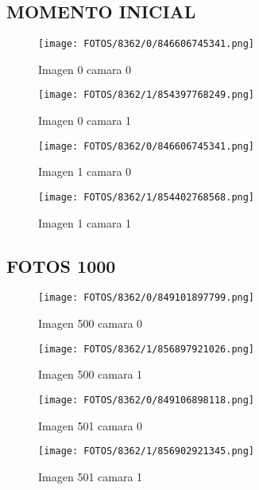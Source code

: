 \documentclass{article}
\begin{document}
\subsection{MOMENTO INICIAL}

\begin{figure}[H]
  \centering
  \begin{minipage}[b]{0.45\textwidth}
    \centering
    \texttt{[image: FOTOS/8362/0/846606745341.png]}
    \caption{Imagen 0 camara 0}
  \end{minipage}
  \begin{minipage}[b]{0.45\textwidth}
    \centering
    \texttt{[image: FOTOS/8362/1/854397768249.png]}
    \caption{Imagen 0 camara 1}
  \end{minipage}
  \begin{minipage}[b]{0.45\textwidth}
    \centering
    \texttt{[image: FOTOS/8362/0/846606745341.png]}
    \caption{Imagen 1 camara 0}
  \end{minipage}
  \begin{minipage}[b]{0.45\textwidth}
    \centering
    \texttt{[image: FOTOS/8362/1/854402768568.png]}
    \caption{Imagen 1 camara 1}
  \end{minipage}
\end{figure}

\subsection{FOTOS 1000}

\begin{figure}[H]
  \centering
  \begin{minipage}[b]{0.45\textwidth}
    \centering
    \texttt{[image: FOTOS/8362/0/849101897799.png]}
    \caption{Imagen 500 camara 0}
  \end{minipage}
  \begin{minipage}[b]{0.45\textwidth}
    \centering
    \texttt{[image: FOTOS/8362/1/856897921026.png]}
    \caption{Imagen 500 camara 1}
  \end{minipage}
  \begin{minipage}[b]{0.45\textwidth}
    \centering
    \texttt{[image: FOTOS/8362/0/849106898118.png]}
    \caption{Imagen 501 camara 0}
  \end{minipage}
  \begin{minipage}[b]{0.45\textwidth}
    \centering
    \texttt{[image: FOTOS/8362/1/856902921345.png]}
    \caption{Imagen 501 camara 1}
  \end{minipage}
\end{figure}
\end{document}
